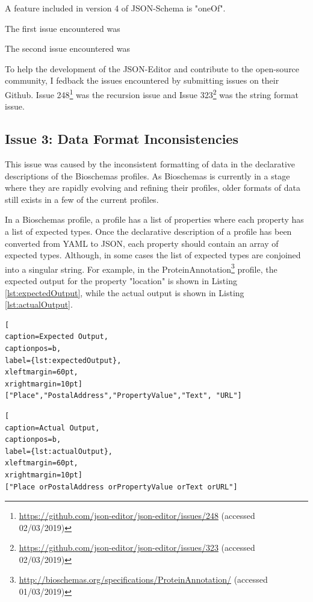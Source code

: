 A feature included in version 4 of JSON-Schema is "oneOf"\cite{jsonSchemaV4}.

The first issue encountered was   


The second issue encountered was

To help the development of the JSON-Editor and contribute to the open-source community, I fedback the issues encountered by submitting issues on their Github. Issue 248\footnote{\url{https://github.com/json-editor/json-editor/issues/248} (accessed 02/03/2019)} was the recursion issue and Issue 323\footnote{\url{https://github.com/json-editor/json-editor/issues/323} (accessed 02/03/2019)}  was the string format issue. 

\subsection{Issue 3: Data Format Inconsistencies}
This issue was caused by the inconsistent formatting of data in the declarative descriptions of the Bioschemas profiles. As Bioschemas is currently in a stage where they are rapidly evolving and refining their profiles, older formats of data still exists in a few of the current profiles. 

In a Bioschemas profile, a profile has a list of properties where each property has a list of expected types. Once the declarative description of a profile has been converted from YAML to JSON, each property should contain an array of expected types. Although, in some cases the list of expected types are conjoined into a singular string. For example, in the ProteinAnnotation\footnote{\url{http://bioschemas.org/specifications/ProteinAnnotation/} (accessed 01/03/2019)} profile, the expected output for the property "location" is shown in Listing \ref{lst:expectedOutput}, while the actual output is shown in Listing \ref{lst:actualOutput}.

\begin{lstlisting}[
caption=Expected Output,
captionpos=b,
label={lst:expectedOutput},
xleftmargin=60pt,
xrightmargin=10pt]
["Place","PostalAddress","PropertyValue","Text", "URL"]
\end{lstlisting}

\begin{center}
  \begin{lstlisting}[
caption=Actual Output,
captionpos=b,
label={lst:actualOutput},
xleftmargin=60pt,
xrightmargin=10pt]
["Place orPostalAddress orPropertyValue orText orURL"]
\end{lstlisting}  
\end{center}


